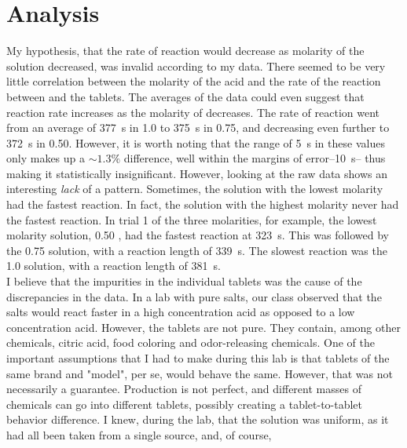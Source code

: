 \documentclass[a4paper]{article}
\begin{document}
    \section{Analysis}
        My hypothesis, that the rate of reaction would decrease as molarity of the 
        solution decreased, was invalid according to my data. There seemed to be very little
        correlation between the molarity of the acid and the rate of the reaction between
         and the tablets. The averages of the data could even suggest that reaction
        rate increases as the molarity of  decreases. The rate of reaction went
        from an average of \SI{377}{\s} in \SI{1.0}{\Molar}  to \SI{375}{\s} in
        \SI{0.75}{\Molar}, and decreasing even further to \SI{372}{\s} in \SI{0.50}{\Molar}.
        However, it is worth noting that the range of \SI{5}{\s} in these values only
        makes up a \(\sim{}1.3\%\) difference, well within the margins of error--\SI{10}{\s}--
        thus making it statistically insignificant. However, looking at the raw data shows
        an interesting \textit{lack} of a pattern. Sometimes, the solution with the lowest molarity
        had the fastest reaction. In fact, the solution with the highest molarity never had
        the fastest reaction. In trial 1 of the three molarities, for example, the lowest
        molarity solution, \SI{0.50}{\Molar} , had the fastest reaction at \SI{323}{\s}.
        This was followed by the \SI{0.75}{\Molar} solution, with a reaction length of \SI{339}{\s}.
        The slowest reaction was the \SI{1.0}{\Molar} solution, with a reaction length of \SI{381}{\s}.
        \\
        I believe that the impurities in the individual tablets was the cause of the discrepancies
        in the data. In a lab with pure salts, our class observed that the salts would react
        faster in a high concentration acid as opposed to a low concentration acid. However, the tablets
        are not pure. They contain, among other chemicals, citric acid, food coloring and odor-releasing
        chemicals. One of the important assumptions that I had to make during this lab is that tablets
        of the same brand and "model", per se, would behave the same. However, that was not necessarily
        a guarantee. Production is not perfect, and different masses of chemicals can go into different
        tablets, possibly creating a tablet-to-tablet behavior difference. I knew, during the lab, that
        the  solution was uniform, as it had all been taken from a single source, and, of course,
\end{document}
